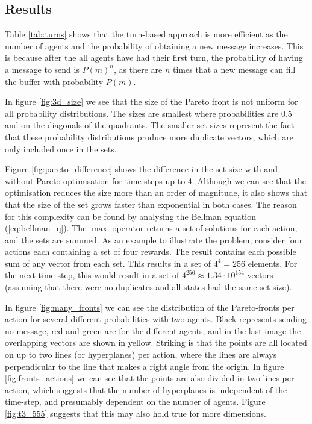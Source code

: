 \documentclass{article}
\begin{document}
	\begin{multicols}{2}
	\section{Results}
	\label{sec:results}
	Table \ref{tab:turns} shows that the turn-based approach is more efficient
	as the number of agents and the probability of obtaining a new message
	increases. This is because after the all agents have had their first turn,
	the probability of having a message to send is $P(m)^n$, as there are
	$n$ times that a new message can fill the buffer with probability $P(m)$.

	In figure \ref{fig:3d_size} we see that the size of the Pareto front is not
	uniform for all probability distributions. The sizes are smallest where
	probabilities are $0.5$ and on the diagonals of the quadrants. The
	smaller set sizes represent the fact that these probability distributions
	produce more duplicate vectors, which are only included once in the sets.

	Figure \ref{fig:pareto_difference} shows the difference in the set size with
	and without Pareto-optimisation for time-steps up to 4. Although we can see
	that the optimisation reduces the size more than an order of magnitude, it
	also shows that that the size of the set grows faster than exponential in
	both cases.
	The reason for this complexity can be found by analysing the Bellman
	equation (\ref{eq:bellman_q}). The $\max$-operator returns a set of
	solutions for each action, and the sets are summed. As an example to
	illustrate the problem, consider four actions each containing a set of four
	rewards. The result contains each possible sum of any vector from each set.
	This results in a set of $4^4=256$ elements. For the next time-step, this
	would result in a set of $4^{256}\approx 1.34\cdot 10^{154}$ vectors
	(assuming that there were no duplicates and all states had the same set
	size).

	In figure \ref{fig:many_fronts} we can see the distribution of the
	Pareto-fronts per action for several different probabilities with two
	agents. Black represents sending no message, red and green are for the
	different agents, and in the last image the overlapping vectors are shown in
	yellow. Striking is that the points are all located on up to two lines (or
	hyperplanes) per action, where the lines are always perpendicular to the
	line that makes a right angle from the origin. In figure
	\ref{fig:fronts_actions} we can
	see that the points are also divided in two lines per action, which suggests
	that the number of hyperplanes is independent of the time-step, and
	presumably dependent on the number of agents. Figure \ref{fig:t3_555}
	suggests that this may also hold true for more dimensions.


\end{multicols}
\end{document}
